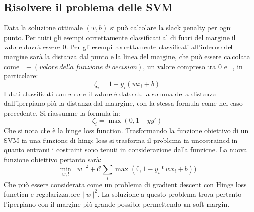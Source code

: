 	\subsection{Risolvere il problema delle SVM}
	Data la soluzione ottimale $(w,b)$ si pu\`o calcolare la slack penalty per ogni punto.
	Per tutti gli esempi correttamente classificati al di fuori del margine il valore dovr\`a essere $0$.
	Per gli esempi correttamente classificati all'interno del margine sar\`a la distanza dal punto e la linea del margine, che pu\`o essere calcolata come $1-(valore\ della\ funzione\ di\ decision)$, un valore compreso tra $0$ e $1$, in particolare:
	$$\zeta_i = 1 - y_i(wx_i+b)$$
	I dati classificati con errore il valore \`e dato dalla somma della distanza dall'iperpiano pi\`u la distanza dal maargine, con la stessa formula come nel caso precedente.
	Si riassumne la formula in:
	$$\zeta_i = \max(0,1-yy')$$
	Che si nota che \`e la hinge loss function.
	Trasformando la funzione obiettivo di un SVM in una funzione di hinge loss si trasforma il problema in uncostrained in quanto entrami i costraint sono tenuti in considerazione dalla funzione.
	La nuova funzione obiettivo pertanto sar\`a:
	$$\min_{w,b}||w||^2+\mathcal{C}\sum_i\max(0,1-y_i*wx_i+b))$$
	Che pu\`o essere considerata come un problema di gradient descent con Hinge loss function e regolarizzatore $||w||^2$.
	La soluzione a questo problema trova pertanto l'iperpiano con il margine pi\`u grande possible permettendo un soft margin.

